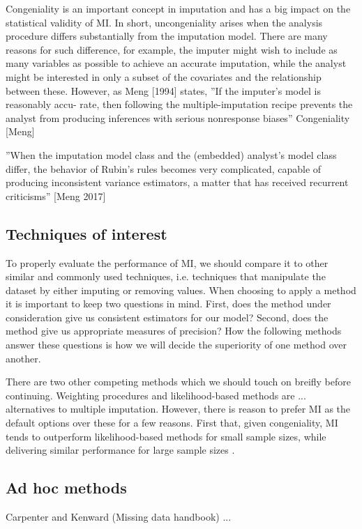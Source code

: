\documentclass{article}
\begin{document}
	Congeniality is an important concept in imputation and has a big impact on the statistical validity of MI. In short, uncongeniality arises when the analysis procedure differs substantially from the imputation model. There are many reasons for such difference, for example, the imputer might wish to include as many variables as possible to achieve an accurate imputation, while the analyst might be interested in only a subset of the covariates and the relationship between these. However, as Meng [1994] states, ''If the imputer's model is reasonably accu-
	rate, then following the multiple-imputation recipe
	prevents the analyst from producing inferences with
	serious nonresponse biases''
	Congeniality [Meng]
	
	''When the imputation model class and the (embedded) analyst’s model class
	differ, the behavior of Rubin’s rules becomes very complicated, capable of producing inconsistent variance estimators, a matter that has received recurrent
	criticisms'' [Meng 2017]
	
	
	\subsection{Techniques of interest}
	To properly evaluate the performance of MI, we should compare it to other similar and commonly used techniques, i.e. techniques that manipulate the dataset by either imputing or removing values. When choosing to apply a method it is important to keep two questions in mind. First, does the method under consideration give us consistent estimators for our model? Second, does the method give us appropriate measures of precision? How the following methods answer these questions is how we will decide the superiority of one method over another.
	
	There are two other competing methods which we should touch on breifly before continuing. Weighting procedures and likelihood-based methods are ... alternatives to multiple imputation. However, there is reason to prefer MI as the default options over these for a few reasons. First that, given congeniality, MI tends to outperform likelihood-based methods for small sample sizes, while delivering similar performance for large sample sizes \cite{schafer_multiple_2016}.
	
	\subsection{Ad hoc methods}
	Carpenter and Kenward (Missing data handbook) ...
	
\end{document}
